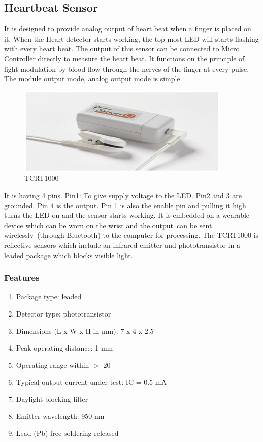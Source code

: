 \documentclass[12pt,a4paper,oneside,openright]{report}
\begin{document}
\subsection{Heartbeat Sensor}
It is designed to provide analog output of heart beat when a finger is placed on it. When the Heart detector starts working, the top most LED will starts flashing with every heart beat. The output of this sensor can be connected to Micro Controller directly to measure the heart beat. It functions on the principle of light modulation by blood flow through the nerves of the finger at every pulse. The module output mode, analog output mode is simple. 

\begin{figure}[!h]
 \centering
 \includegraphics[width = .80\textwidth]{Figures/9.jpg}
 \caption{TCRT1000}
 \label{TCRT1000}
\end{figure}
It is having 4 pins.  Pin1: To give supply voltage to the LED. Pin2 and 3 are grounded. Pin 4 is the output. Pin 1 is also the enable pin and pulling it high turns the LED on and the sensor starts working. It is embedded on a wearable device which can be worn on the wrist and the output can be sent wirelessly (through Bluetooth) to the computer for processing. The TCRT1000 is reflective sensors which include an infrared emitter and phototransistor in a leaded package which blocks visible light.

\subsubsection{Features}
\begin{enumerate}
 \item Package type: leaded
\item Detector type: phototransistor 
\item Dimensions (L x W x H in mm): 7 x 4 x 2.5 
\item Peak operating distance: 1 mm 
\item Operating range within $>$ 20 %
\item Typical output current under test: IC = 0.5 mA 
\item Daylight blocking filter 
\item Emitter wavelength: 950 nm 
\item Lead (Pb)-free soldering released
\end{enumerate}
\end{document}
